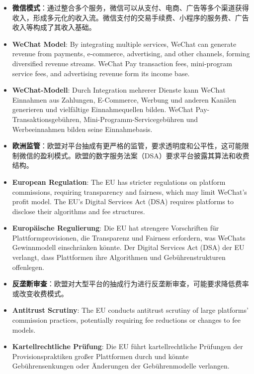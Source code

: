 \documentclass[11pt,a4paper]{article}
\begin{document}
\begin{itemize}
    \item \textbf{微信模式}：通过整合多个服务，微信可以从支付、电商、广告等多个渠道获得收入，形成多元化的收入流。微信支付的交易手续费、小程序的服务费、广告收入等构成了其收入基础。
    \item \textbf{WeChat Model}: By integrating multiple services, WeChat can generate revenue from payments, e-commerce, advertising, and other channels, forming diversified revenue streams. WeChat Pay transaction fees, mini-program service fees, and advertising revenue form its income base.
    \item \textbf{WeChat-Modell}: Durch Integration mehrerer Dienste kann WeChat Einnahmen aus Zahlungen, E-Commerce, Werbung und anderen Kanälen generieren und vielfältige Einnahmequellen bilden. WeChat Pay-Transaktionsgebühren, Mini-Programm-Servicegebühren und Werbeeinnahmen bilden seine Einnahmebasis.
    
    \item \textbf{欧洲监管}：欧盟对平台抽成有更严格的监管，要求透明度和公平性，这可能限制微信的盈利模式。欧盟的数字服务法案（DSA）要求平台披露其算法和收费结构。
    \item \textbf{European Regulation}: The EU has stricter regulations on platform commissions, requiring transparency and fairness, which may limit WeChat's profit model. The EU's Digital Services Act (DSA) requires platforms to disclose their algorithms and fee structures.
    \item \textbf{Europäische Regulierung}: Die EU hat strengere Vorschriften für Plattformprovisionen, die Transparenz und Fairness erfordern, was WeChats Gewinnmodell einschränken könnte. Der Digital Services Act (DSA) der EU verlangt, dass Plattformen ihre Algorithmen und Gebührenstrukturen offenlegen.
    
    \item \textbf{反垄断审查}：欧盟对大型平台的抽成行为进行反垄断审查，可能要求降低费率或改变收费模式。
    \item \textbf{Antitrust Scrutiny}: The EU conducts antitrust scrutiny of large platforms' commission practices, potentially requiring fee reductions or changes to fee models.
    \item \textbf{Kartellrechtliche Prüfung}: Die EU führt kartellrechtliche Prüfungen der Provisionspraktiken großer Plattformen durch und könnte Gebührensenkungen oder Änderungen der Gebührenmodelle verlangen.
\end{itemize}
\end{document}
